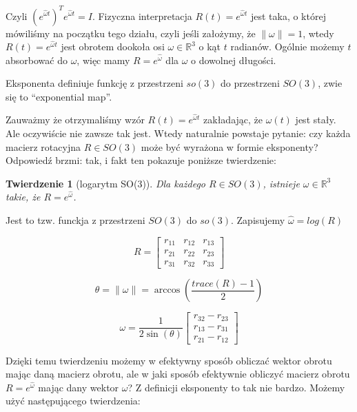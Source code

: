 \documentclass[a4paper,12pt]{article}
\newtheorem{theo}[defi]{Twierdzenie}
\newcommand{\RR}{\mathbb{R}^3}
\begin{document}
Czyli $(e^{\hat{\omega}t})^Te^{\hat{\omega}t}=I$. Fizyczna interpretacja $R(t) = e^{\hat{\omega}t}$ jest taka, o której mówiliśmy na początku tego działu, czyli jeśli założymy, że $\| \omega \| = 1$, wtedy $R(t)=e^{\hat{\omega}t}$ jest obrotem dookoła osi $\omega \in \RR$ o kąt $t$ radianów. Ogólnie możemy $t$ absorbować do $\omega$, więc mamy $R = e^{\hat{\omega}}$ dla $\omega$ o dowolnej długości.

Eksponenta definiuje funkcję z przestrzeni $so(3)$ do przestrzeni $SO(3)$, zwie się to ``exponential map''. 

Zauważmy że otrzymaliśmy wzór $R(t) = e^{\hat{\omega}t}$ zakładając, że $\omega(t)$ jest stały. Ale oczywiście nie zawsze tak jest. Wtedy naturalnie powstaje pytanie: czy każda macierz rotacyjna $R \in SO(3)$ może być wyrażona w formie eksponenty? Odpowiedź brzmi: tak, i fakt ten pokazuje poniższe twierdzenie:

\begin{theo}[logarytm SO(3)]
Dla każdego $R \in SO(3)$, istnieje $\omega \in \RR$ takie, że $R = e^{\hat{\omega}}$. 
\end{theo}

\noindent Jest to tzw. funckja z przestrzeni $SO(3)$ do $so(3)$. Zapisujemy $\hat{\omega} = log(R)$

\begin{equation}
R = 
\begin{bmatrix}
  r_{11} & r_{12} & r_{13} \\
  r_{21} & r_{22} & r_{23} \\
  r_{31} & r_{32} & r_{33}
\end{bmatrix}
\end{equation}

\begin{equation}
\theta = \| \omega \| = \arccos(\frac{trace(R)-1}{2})
\end{equation}

\begin{equation}
\omega = \frac{1}{2\sin(\theta)}
\begin{bmatrix}
  r_{32} - r_{23} \\ r_{13} - r_{31} \\ r_{21} - r_{12}
\end{bmatrix}
\end{equation}

Dzięki temu twierdzeniu możemy w efektywny sposób obliczać wektor obrotu mając daną macierz obrotu, ale w jaki sposób efektywnie obliczyć macierz obrotu $R = e^{\hat{\omega}}$ mając dany wektor $\omega$? Z definicji eksponenty to tak nie bardzo. Możemy użyć następującego twierdzenia:
\end{document}
